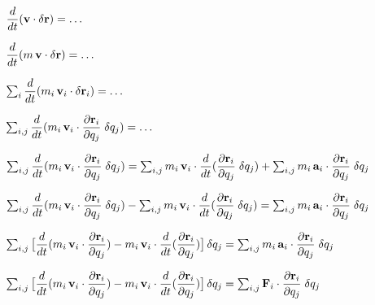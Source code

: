 \documentclass[10pt]{article}
\begin{document}
\newpage

\par {}

\bigskip \medskip

\noindent $\dfrac{d}{dt}(\bf{v} \cdot \delta \bf{r}) = \ldots$
\par \bigskip
\par \bigskip
\noindent $\dfrac{d}{dt}(m \, \bf{v} \cdot \delta \bf{r}) = \ldots$
\par \bigskip
\noindent $\sum_i \dfrac{d}{dt}(m_i \, {\bf{v}}_i \cdot \delta {\bf{r}}_i) = \ldots$
\par \bigskip
\noindent $\sum_{i,j} \dfrac{d}{dt}(m_i \, {\bf{v}}_i \cdot \dfrac{\partial {\bf{r}}_i}{\partial q_j} \; \delta q_j) = \ldots$
\par \bigskip
\par \bigskip
\noindent $\sum_{i,j} \dfrac{d}{dt}(m_i \, {\bf{v}}_i \cdot \dfrac{\partial {\bf{r}}_i}{\partial q_j} \; \delta q_j) = \sum_{i,j} m_i \, {\bf{v}}_i \cdot \dfrac{d}{dt}(\dfrac{\partial {\bf{r}}_i}{\partial q_j} \; \delta q_j) + \sum_{i,j} m_i \, {\bf{a}}_i \cdot \dfrac{\partial {\bf{r}}_i}{\partial q_j} \; \delta q_j$
\par \bigskip
\noindent $\sum_{i,j} \dfrac{d}{dt}(m_i \, {\bf{v}}_i \cdot \dfrac{\partial {\bf{r}}_i}{\partial q_j} \; \delta q_j) - \sum_{i,j} m_i \, {\bf{v}}_i \cdot \dfrac{d}{dt}(\dfrac{\partial {\bf{r}}_i}{\partial q_j} \; \delta q_j) = \sum_{i,j} m_i \, {\bf{a}}_i \cdot \dfrac{\partial {\bf{r}}_i}{\partial q_j} \; \delta q_j$
\par \bigskip
\noindent $\sum_{i,j} \big [ \dfrac{d}{dt}(m_i \, {\bf{v}}_i \cdot \dfrac{\partial {\bf{r}}_i}{\partial q_j}) - m_i \, {\bf{v}}_i \cdot \dfrac{d}{dt}(\dfrac{\partial {\bf{r}}_i}{\partial q_j}) \big ] \, \delta q_j = \sum_{i,j} m_i \, {\bf{a}}_i \cdot \dfrac{\partial {\bf{r}}_i}{\partial q_j} \; \delta q_j$
\par \bigskip
\par \bigskip
\noindent $\sum_{i,j} \big [ \dfrac{d}{dt}(m_i \, {\bf{v}}_i \cdot \dfrac{\partial {\bf{r}}_i}{\partial q_j}) - m_i \, {\bf{v}}_i \cdot \dfrac{d}{dt}(\dfrac{\partial {\bf{r}}_i}{\partial q_j}) \big ] \, \delta q_j = \sum_{i,j} {\bf{F}}_i \cdot \dfrac{\partial {\bf{r}}_i}{\partial q_j} \; \delta q_j$

\bigskip \smallskip
\end{document}
